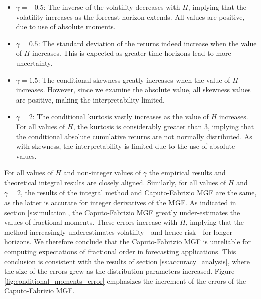\begin{itemize}
\item \(\gamma = -0.5\): The inverse of the volatility decreases with \(H\), implying that the volatility increases as the forecast horizon extends. All values are positive, due to use of absolute moments.
\item \(\gamma = 0.5\): The standard deviation of the returns indeed increase when the value of \(H\) increases. This is expected as greater time horizons lead to more uncertainty.

\item  \(\gamma = 1.5\): The conditional skewness greatly increases when the value of \(H\) increases. However, since we examine the absolute value, all skewness values are positive, making the interpretability limited.

\item  \(\gamma = 2\): The conditional kurtosis vastly increases as the value of \(H\) increases. For all values of \(H\), the kurtosis is considerably greater than 3, implying that the conditional absolute cumulative returns are not normally distributed. As with skewness, the interpretability is limited due to the use of absolute values.
\end{itemize}

For all values of \(H\) and non-integer values of \(\gamma\) the empirical results and  theoretical  integral results are closely aligned. Similarly, for all values of \(H\) and \(\gamma = 2\), the results of the integral method and Caputo-Fabrizio MGF are the same, as the latter is accurate for integer derivatives of the MGF. As indicated in section \ref{s:simulation}, the Caputo-Fabrizio MGF greatly under-estimates the values of fractional moments. These errors increase with \(H\), implying that the method increasingly underestimates volatility - and hence risk - for longer horizons. We therefore conclude that the Caputo-Fabrizio MGF is unreliable for computing expectations of fractional order in forecasting applications. This conclusion is consistent with the results of section \ref{ss:accuracy_analysis}, where the size of the errors grew as the distribution parameters increased. Figure \ref{fig:conditional_moments_error} emphasizes the increment of the errors of the Caputo-Fabrizio MGF.



